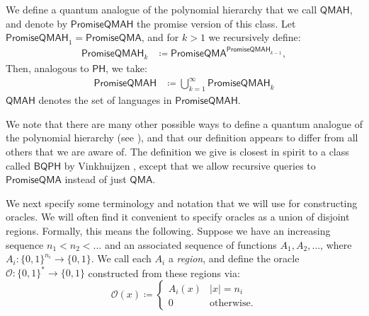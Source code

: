 \documentclass[10pt,a4paper]{article}
\newcommand{\Dom}{\mathrm{Dom}}
\begin{document}
We define a quantum analogue of the polynomial hierarchy that we call $\mathsf{QMAH}$, and denote by $\mathsf{PromiseQMAH}$ the promise version of this class. Let $\mathsf{PromiseQMAH}_1 = \mathsf{PromiseQMA}$, and for $k > 1$ we recursively define:
\begin{align*}
\mathsf{PromiseQMAH}_k &\coloneqq \mathsf{PromiseQMA}^{\mathsf{PromiseQMAH}_{k-1}},
\end{align*}
Then, analogous to $\mathsf{PH}$, we take:
\begin{align*}
\mathsf{PromiseQMAH} &\coloneqq \bigcup_{k=1}^\infty \mathsf{PromiseQMAH}_k
\end{align*}
$\mathsf{QMAH}$ denotes the set of languages in $\mathsf{PromiseQMAH}$.

We note that there are many other possible ways to define a quantum analogue of the polynomial hierarchy (see \cite{GSS+18}), and that our definition appears to differ from all others that we are aware of. The definition we give is closest in spirit to a class called $\mathsf{BQPH}$ by Vinkhuijzen \cite{Vin18}, except that we allow recursive queries to $\mathsf{PromiseQMA}$ instead of just $\mathsf{QMA}$.


We next specify some terminology and notation that we will use for constructing oracles. We will often find it convenient to specify oracles as a union of disjoint regions. Formally, this means the following. Suppose we have an increasing sequence $n_1 < n_2 < ...$ and an associated sequence of functions $A_1, A_2, \ldots$, where $A_i: \{0,1\}^{n_i} \to \{0,1\}$. We call each $A_i$ a \textit{region}, and define the oracle $\mathcal{O}: \{0,1\}^* \to \{0,1\}$ constructed from these regions via:
\[
\mathcal{O}(x) \coloneqq \begin{cases}
A_i(x) & |x| = n_i\\
0 & \text{otherwise.}
\end{cases}
\]
\end{document}
